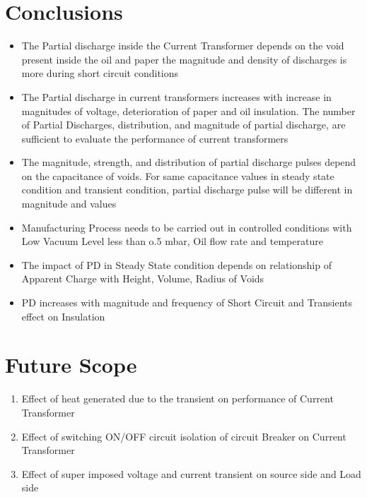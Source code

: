 \section{Conclusions}
\begin{itemize}
\item The Partial discharge inside the Current Transformer depends on the void present inside the oil and paper the magnitude and density of discharges is more during short circuit conditions 

\item The Partial discharge in current transformers increases with increase in magnitudes of voltage, deterioration of paper and oil insulation. The number of Partial Discharges, distribution, and magnitude of partial discharge, are sufficient to evaluate the performance of current transformers 

\item The magnitude, strength, and distribution of partial discharge pulses depend on the capacitance of voids. For same capacitance values in steady state condition and transient condition, partial discharge pulse will be different in magnitude and values 

\item Manufacturing Process needs to be carried out in controlled conditions with Low Vacuum Level less than o.5 mbar, Oil flow rate and temperature

\item The impact of PD in Steady State condition depends on relationship of Apparent Charge with Height, Volume, Radius of Voids

\item PD increases with magnitude and frequency of Short Circuit and Transients effect on Insulation
\end{itemize}
 
\pagebreak 

\section{Future Scope}
\begin{enumerate}
\item Effect of heat generated due to the transient on performance of Current Transformer 

\item Effect of switching ON/OFF circuit isolation of circuit Breaker on Current Transformer

\item Effect of super imposed voltage and current transient on source side and Load side
\end{enumerate}

